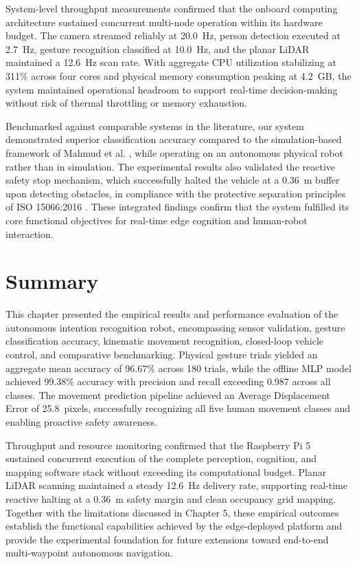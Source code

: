 System-level throughput measurements confirmed that the onboard computing architecture sustained concurrent multi-node operation within its hardware budget. The camera streamed reliably at 20.0~Hz, person detection executed at 2.7~Hz, gesture recognition classified at 10.0~Hz, and the planar LiDAR maintained a 12.6~Hz scan rate. With aggregate CPU utilization stabilizing at 311\% across four cores and physical memory consumption peaking at 4.2~GB, the system maintained operational headroom to support real-time decision-making without risk of thermal throttling or memory exhaustion.

Benchmarked against comparable systems in the literature, our system demonstrated superior classification accuracy compared to the simulation-based framework of Mahmud et al. \cite{mahmud2022}, while operating on an autonomous physical robot rather than in simulation. The experimental results also validated the reactive safety stop mechanism, which successfully halted the vehicle at a 0.36~m buffer upon detecting obstacles, in compliance with the protective separation principles of ISO 15066:2016 \cite{iso150662016}. These integrated findings confirm that the system fulfilled its core functional objectives for real-time edge cognition and human-robot interaction.

\section{Summary}
This chapter presented the empirical results and performance evaluation of the autonomous intention recognition robot, encompassing sensor validation, gesture classification accuracy, kinematic movement recognition, closed-loop vehicle control, and comparative benchmarking. Physical gesture trials yielded an aggregate mean accuracy of 96.67\% across 180 trials, while the offline MLP model achieved 99.38\% accuracy with precision and recall exceeding 0.987 across all classes. The movement prediction pipeline achieved an Average Displacement Error of 25.8~pixels, successfully recognizing all five human movement classes and enabling proactive safety awareness.

Throughput and resource monitoring confirmed that the Raspberry Pi 5 sustained concurrent execution of the complete perception, cognition, and mapping software stack without exceeding its computational budget. Planar LiDAR scanning maintained a steady 12.6~Hz delivery rate, supporting real-time reactive halting at a 0.36~m safety margin and clean occupancy grid mapping. Together with the limitations discussed in Chapter 5, these empirical outcomes establish the functional capabilities achieved by the edge-deployed platform and provide the experimental foundation for future extensions toward end-to-end multi-waypoint autonomous navigation.


